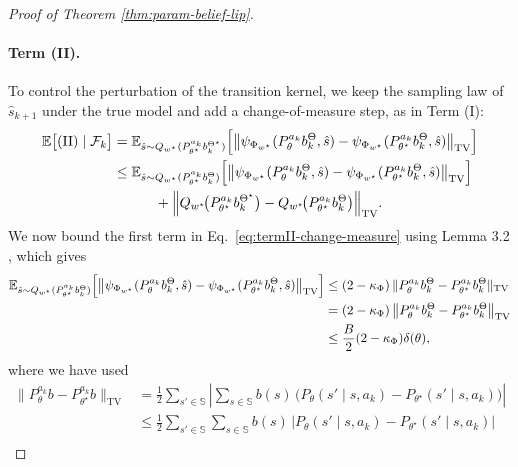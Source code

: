 \documentclass[10pt]{article} %
\theoremstyle{plain}
\theoremstyle{definition}
\theoremstyle{remark}
\newcommand{\bE}{\mathbb{E}}
\newcommand{\bS}{\mathbb{S}}
\begin{document}
\begin{proof}[Proof of Theorem \ref{thm:param-belief-lip}]
\paragraph{Term (II).} To control the perturbation of the transition kernel, we keep the sampling law of \(\hat s_{k+1}\) under the true model and add a change-of-measure step, as in Term (I):
\begin{align}\label{eq:termII-change-measure}
\bE\big[\mathrm{(II)}\mid \mathcal F_k\big]
&=
\bE_{\hat s\sim Q_{w^\star}(P_{\theta^\star}^{a_k} b_k^{\Theta^\star})}
\Big[\big\|\psi_{\Phi_{w^\star}}(P_{\theta}^{a_k} b_k^{\Theta},\hat s)-\psi_{\Phi_{w^\star}}(P_{\theta^\star}^{a_k} b_k^{\Theta},\hat s)\big\|_{\mathrm{TV}}\Big]\notag\\
&\le
\bE_{\hat s\sim Q_{w^\star}(P_{\theta^\star}^{a_k} b_k^{\Theta})}
\Big[\big\|\psi_{\Phi_{w^\star}}(P_{\theta}^{a_k} b_k^{\Theta},\hat s)-\psi_{\Phi_{w^\star}}(P_{\theta^\star}^{a_k} b_k^{\Theta},\hat s)\big\|_{\mathrm{TV}}\Big]\notag\\
&\qquad\quad+\Big\|Q_{w^\star}\!\big(P_{\theta^\star}^{a_k} b_k^{\Theta^\star}\big)-Q_{w^\star}\!\big(P_{\theta^\star}^{a_k} b_k^{\Theta}\big)\Big\|_{\mathrm{TV}}.
\end{align}
We now bound the first term in Eq.~\ref{eq:termII-change-measure} using Lemma 3.2 \cite{Mcdonald2024StochasticCriteria}, which gives
\begin{align}\label{eq:termII-lemma32-part}
\bE_{\hat s\sim Q_{w^\star}(P_{\theta^\star}^{a_k} b_k^{\Theta})}
\Big[\big\|\psi_{\Phi_{w^\star}}(P_{\theta}^{a_k} b_k^{\Theta},\hat s)-\psi_{\Phi_{w^\star}}(P_{\theta^\star}^{a_k} b_k^{\Theta},\hat s)\big\|_{\mathrm{TV}}\Big]
&\le (2-\kappa_\Phi)\,\|P_{\theta}^{a_k} b_k^{\Theta}-P_{\theta^\star}^{a_k} b_k^{\Theta}\|_{\mathrm{TV}}\notag\\
&= (2-\kappa_\Phi)\,\big\|P_{\theta}^{a_k}b_k^\Theta-P_{\theta^\star}^{a_k}b_k^\Theta\big\|_{\mathrm{TV}}\notag\\
&\le \frac{B}{2}(2-\kappa_\Phi)\delta(\theta),
\end{align}
where we have used
\begin{align*}
\bigl\|P_\theta^{a_k} b - P_{\theta^\star}^{a_k} b\bigr\|_{\mathrm{TV}}
&= \frac12 \sum_{s'\in\bS} \left| \sum_{s\in\bS} b(s)\,\Big(P_\theta(s'\mid s,a_k)-P_{\theta^\star}(s'\mid s,a_k)\Big) \right|\\[4pt]
&\le \frac12 \sum_{s'\in\bS} \sum_{s\in\bS} b(s)\, \Big|P_\theta(s'\mid s,a_k)-P_{\theta^\star}(s'\mid s,a_k)\Big| \\[4pt]

\end{align*}
\end{proof}
\end{document}
